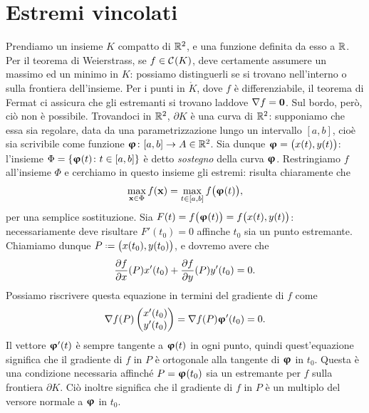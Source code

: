 \section{Estremi vincolati}
Prendiamo un insieme $K$ compatto di $\mathbb{R}^2$, e una funzione definita da esso a $\mathbb{R}$.
Per il teorema di Weierstrass, se $f\in\mathcal{C}^{{}}(K)$, deve certamente assumere un massimo ed un minimo in $K$: possiamo distinguerli se si trovano nell'interno o sulla frontiera dell'insieme.
Per i punti in $\mathring{K}$, dove $f$ è differenziabile, il teorema di Fermat ci assicura che gli estremanti si trovano laddove $\nabla f=\mathbf{0}$.
Sul bordo, però, ciò non è possibile. Trovandoci in $\mathbb{R}^2$, $\partial K$ è una curva di $\mathbb{R}^2$: supponiamo che essa sia regolare, data da una parametrizzazione lungo un intervallo $[a,b]$, cioè sia scrivibile come funzione $\bm{\upvarphi}\colon[a,b]\to A\in\mathbb{R}^2$.
Sia dunque $\bm{\upvarphi}=\big(x(t),y(t)\big)$: l'insieme $\Phi=\{\bm{\upvarphi}(t)\colon t\in[a,b]\}$ è detto \emph{sostegno} della curva $\bm{\upvarphi}$.
Restringiamo $f$ all'insieme $\Phi$ e cerchiamo in questo insieme gli estremi: risulta chiaramente che
\begin{equation*}
	\max_{\mathbf{x}\in\Phi}f(\mathbf{x})=\max_{t\in[a,b]}f\big(\bm{\upvarphi}(t)\big),
\end{equation*}
per una semplice sostituzione.
Sia $F(t)=f\big(\bm{\upvarphi}(t)\big)=f\big(x(t),y(t)\big)$: necessariamente deve risultare $F'(t_0)=0$ affinche $t_0$ sia un punto estremante.
Chiamiamo dunque $P\defeq\big(x(t_0),y(t_0)\big)$, e dovremo avere che
\begin{equation}
	\frac{\partial {f}}{\partial {x}}(P)x'(t_0)+\frac{\partial {f}}{\partial {y}}(P)y'(t_0)=0.
\end{equation}
Possiamo riscrivere questa equazione in termini del gradiente di $f$ come
\begin{equation}
	\nabla f(P)\begin{pmatrix} x'(t_0)\\y'(t_0) \end{pmatrix}=\nabla f(P)\bm{\upvarphi}'(t_0)=0.
\end{equation}
Il vettore $\bm{\upvarphi}'(t)$ è sempre tangente a $\bm{\upvarphi}(t)$ in ogni punto, quindi quest'equazione significa che il gradiente di $f$ in $P$ è ortogonale alla tangente di $\bm{\upvarphi}$ in $t_0$.
Questa è una condizione necessaria affinché $P=\bm{\upvarphi}(t_0)$ sia un estremante per $f$ sulla frontiera $\partial K$.
Ciò inoltre significa che il gradiente di $f$ in $P$ è un multiplo del versore normale a $\bm{\upvarphi}$ in $t_0$.


